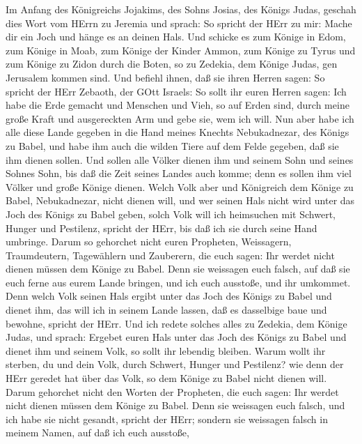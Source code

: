  Im Anfang des Königreichs Jojakims, des Sohns Josias, des
Königs Judas, geschah dies Wort vom HErrn zu Jeremia und sprach:
 So spricht der HErr zu mir: Mache dir ein Joch und hänge es
an deinen Hals.  Und schicke es zum Könige in Edom, zum
Könige in Moab, zum Könige der Kinder Ammon, zum Könige zu Tyrus und zum
Könige zu Zidon durch die Boten, so zu Zedekia, dem Könige Judas, gen
Jerusalem kommen sind.  Und befiehl ihnen, daß sie ihren
Herren sagen: So spricht der HErr Zebaoth, der GOtt Israels: So sollt
ihr euren Herren sagen:  Ich habe die Erde gemacht und
Menschen und Vieh, so auf Erden sind, durch meine große Kraft und
ausgereckten Arm und gebe sie, wem ich will.  Nun aber habe
ich alle diese Lande gegeben in die Hand meines Knechts Nebukadnezar,
des Königs zu Babel, und habe ihm auch die wilden Tiere auf dem Felde
gegeben, daß sie ihm dienen sollen.  Und sollen alle Völker
dienen ihm und seinem Sohn und seines Sohnes Sohn, bis daß die Zeit
seines Landes auch komme; denn es sollen ihm viel Völker und große
Könige dienen.  Welch Volk aber und Königreich dem Könige zu
Babel, Nebukadnezar, nicht dienen will, und wer seinen Hals nicht wird
unter das Joch des Königs zu Babel geben, solch Volk will ich heimsuchen
mit Schwert, Hunger und Pestilenz, spricht der HErr, bis daß ich sie
durch seine Hand umbringe.  Darum so gehorchet nicht euren
Propheten, Weissagern, Traumdeutern, Tagewählern und Zauberern, die euch
sagen: Ihr werdet nicht dienen müssen dem Könige zu Babel. 
Denn sie weissagen euch falsch, auf daß sie euch ferne aus eurem Lande
bringen, und ich euch ausstoße, und ihr umkommet.  Denn
welch Volk seinen Hals ergibt unter das Joch des Königs zu Babel und
dienet ihm, das will ich in seinem Lande lassen, daß es dasselbige baue
und bewohne, spricht der HErr.  Und ich redete solches
alles zu Zedekia, dem Könige Judas, und sprach: Ergebet euren Hals unter
das Joch des Königs zu Babel und dienet ihm und seinem Volk, so sollt
ihr lebendig bleiben.  Warum wollt ihr sterben, du und dein
Volk, durch Schwert, Hunger und Pestilenz? wie denn der HErr geredet hat
über das Volk, so dem Könige zu Babel nicht dienen will. 
Darum gehorchet nicht den Worten der Propheten, die euch sagen: Ihr
werdet nicht dienen müssen dem Könige zu Babel. Denn sie weissagen euch
falsch,  und ich habe sie nicht gesandt, spricht der HErr;
sondern sie weissagen falsch in meinem Namen, auf daß ich euch ausstoße,
